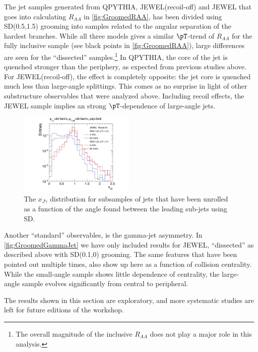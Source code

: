 The jet samples generated from QPYTHIA, JEWEL(recoil-off) and JEWEL that goes into calculating $R_{AA}$ in \autoref{fig:GroomedRAA}, has been divided using SD(0.5,1.5) grooming into samples related to the angular separation of the hardest branches. While all three models gives a similar $\pT$-trend of $R_{AA}$ for the fully inclusive sample (see black points in \autoref{fig:GroomedRAA}), large differences are seen for the ``dissected'' samples.\footnote{The overall magnitude of the inclusive $R_{AA}$ does not play a major role in this analysis.} In QPYTHIA, the core of the jet is quenched stronger than the periphery, as expected from previous studies above. For JEWEL(recoil-off), the effect is completely opposite: the jet core is quenched much less than large-angle splittings. This comes as no surprise in light  of other substructure observables that were analyzed above. Including recoil effects, the JEWEL sample implies an strong $\pT$-dependence of large-angle jets.

\begin{figure}[th]
\centering
\includegraphics[width=0.5\textwidth]{figures/Observables_GammaJet/GammaJet_groomed}%
\caption{The $x_{J\gamma}$ distribution for subsamples of jets that have been unrolled as a function of the angle found between the leading sub-jets using SD. }
\label{fig:GroomedGammaJet}
\end{figure}
Another ``standard'' observables, is the gamma-jet asymmetry. 
In \autoref{fig:GroomedGammaJet} we have only included results for JEWEL, ``dissected'' as described above with SD(0.1,0) grooming. The same features that have been pointed out multiple times, also show up here as a function of collision centrality. While the small-angle sample shows little dependence of centrality, the large-angle sample evolves significantly from central to peripheral.

The results shown in this section are exploratory, and more systematic studies are left for future editions of the workshop.

\label{sec:observablesubtraction}